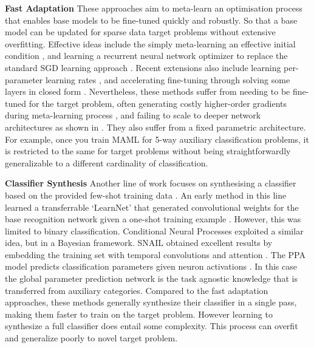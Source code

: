 \documentclass[conference]{IEEEtran}
\newcommand{\keypoint}[1]{\vspace{0.05cm}\noindent\textbf{#1}\quad}
\begin{document}
\keypoint{Fast Adaptation} These approaches aim to meta-learn an optimisation process that enables base models to be fine-tuned quickly and robustly. So that a base model can be updated for sparse data target problems without extensive overfitting. Effective ideas include the simply meta-learning an effective initial condition \cite{finn2017model,DBLP:journals/corr/abs-1803-02999}, and learning a recurrent neural network optimizer to replace the standard SGD learning approach \cite{ravi2017optimization}. Recent extensions also include learning per-parameter learning rates \cite{li2017meta}, and accelerating fine-tuning through solving some layers in closed form \cite{bertinetto2018closedFormMeta}. Nevertheless, these methods suffer from needing to be fine-tuned for the target problem, often generating costly higher-order gradients during meta-learning process \cite{finn2017model}, and failing to scale to deeper network architectures as shown in \cite{mishra2018simple}. They also suffer from a fixed parametric architecture. For example, once you train MAML \cite{finn2017model} for 5-way auxiliary classification problems, it is restricted to the same for target problems without being straightforwardly generalizable to a different cardinality of classification. 

\keypoint{Classifier Synthesis}
Another line of work focuses on synthesising a classifier based on the provided few-shot training data \cite{gidaris2018dynamic}. An early method in this line learned a transferrable `LearnNet' that generated convolutional weights for the base recognition network given a one-shot training example \cite{bertinetto2016feedForwardOneShot}. However, this was limited to binary classification. Conditional Neural Processes \cite{garnelo2018conditional} exploited a similar idea, but in a Bayesian framework. SNAIL obtained excellent results by embedding the training set with temporal convolutions and attention \cite{mishra2018simple}. The PPA model predicts  classification parameters given neuron activations \cite{qiao2017few}. In this case the global parameter prediction network is the task agnostic knowledge that is transferred from auxiliary categories. Compared to the fast adaptation approaches, these methods generally synthesize their classifier in a single pass, making them faster to train on the target problem. {However learning to synthesize a full classifier does entail some complexity. This process can overfit and  generalize poorly to novel target problem.}
\end{document}
